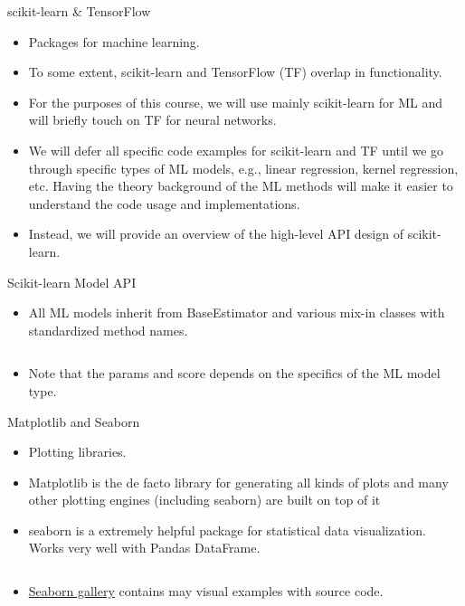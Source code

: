 \documentclass[aspectratio=169]{beamer}
\begin{document}
\begin{frame}{scikit-learn \& TensorFlow}
    \begin{itemize}
        \item Packages for machine learning.
        \item To some extent, scikit-learn and TensorFlow (TF) overlap in functionality.
        \item For the purposes of this course, we will use mainly scikit-learn for ML and will briefly touch on TF for neural networks.
        \item We will defer all specific code examples for scikit-learn and TF until we go through specific types of ML models, e.g., linear regression, kernel regression, etc. Having the theory background of the ML methods will make it easier to understand the code usage and implementations.
        \item Instead, we will provide an overview of the high-level API design of scikit-learn.
    \end{itemize}
\end{frame} 


\begin{frame}[fragile]{Scikit-learn Model API}
    \begin{itemize}
        \item All ML models inherit from BaseEstimator and various mix-in classes with standardized method names.
        \inputminted{python}{example_sklearn.py}
        \item Note that the params and score depends on the specifics of the ML model type.
    \end{itemize}
\end{frame} 



\begin{frame}[fragile]{Matplotlib and Seaborn}
    \begin{itemize}
        \item Plotting libraries.
        \item Matplotlib is the de facto library for generating all kinds of plots and many other plotting engines (including seaborn) are built on top of it
        \item seaborn is a extremely helpful package for statistical data visualization. Works very well with Pandas DataFrame.
\inputminted{python}{example_plotting.py}
        \item \href{http://seaborn.pydata.org/examples/index.html}{Seaborn gallery} contains may visual examples with source code. 
    \end{itemize}
\end{frame} 
\end{document}
